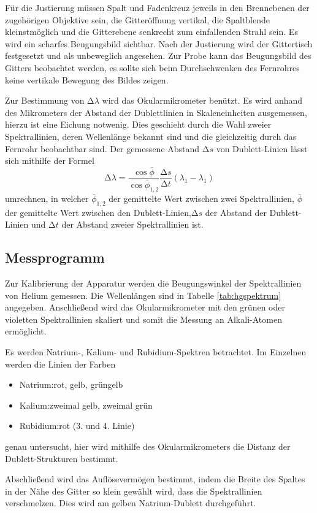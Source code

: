 Für die Justierung müssen Spalt und Fadenkreuz jeweils in den Brennebenen der zugehörigen Objektive sein, die Gitteröffnung vertikal, die Spaltblende kleinstmöglich und die Gitterebene senkrecht zum einfallenden Strahl sein. 
Es wird ein scharfes Beugungsbild sichtbar.
Nach der Justierung wird der Gittertisch festgesetzt und als unbeweglich angesehen.
Zur Probe kann das Beugungsbild des Gitters beobachtet werden, es sollte sich beim Durchschwenken des Fernrohres keine vertikale Bewegung des Bildes zeigen.

Zur Bestimmung von $\mathup{\Delta}\lambda$ wird das Okularmikrometer benützt.
Es wird anhand des Mikrometers der Abstand der Dublettlinien in Skaleneinheiten ausgemessen, hierzu ist eine Eichung notwenig.
Dies geschieht durch die Wahl zweier Spektrallinien, deren Wellenlänge bekannt sind und die gleichzeitig durch das Fernrohr beobachtbar sind.
Der gemessene Abstand $\mathup{\Delta}s$ von Dublett-Linien lässt sich mithilfe der Formel
\begin{equation}
	\mathup{\Delta}\lambda=\frac{\cos{\bar\phi}}{\cos{\bar\phi_{1,2}}}\frac{\mathup{\Delta}s}{\mathup{\Delta}t}(\lambda_1-\lambda_1)
\end{equation}
umrechnen, in welcher $\bar\phi_{1,2}$ der gemittelte Wert zwischen zwei Spektrallinien, $\bar\phi$ der gemittelte Wert zwischen den Dublett-Linien,$\mathup{\Delta}s$ der Abstand der Dublett-Linien und $\mathup{\Delta}t$ der Abstand zweier Spektrallinien ist.

\subsection{Messprogramm}
Zur Kalibrierung der Apparatur werden die Beugungswinkel der Spektrallinien von Helium gemessen.
Die Wellenlängen sind in Tabelle \ref{tab:hgspektrum} angegeben.
Anschließend wird das Okularmikrometer mit den grünen oder violetten Spektrallinien skaliert und somit die Messung an Alkali-Atomen ermöglicht.

Es werden Natrium-, Kalium- und Rubidium-Spektren betrachtet.
Im Einzelnen werden die Linien der Farben
\begin{itemize}
	\item{Natrium:\hspace{10pt}rot, gelb, grüngelb}
	\item{Kalium:\hspace{15pt}zweimal gelb, zweimal grün}
	\item{Rubidium:\hspace{3pt}rot (3. und 4. Linie)}
\end{itemize}
genau untersucht, hier wird mithilfe des Okularmikrometers die Distanz der Dublett-Strukturen bestimmt.

Abschließend wird das Auflösevermögen bestimmt, indem die Breite des Spaltes in der Nähe des Gitter so klein gewählt wird, dass die Spektrallinien verschmelzen.
Dies wird am gelben Natrium-Dublett durchgeführt.